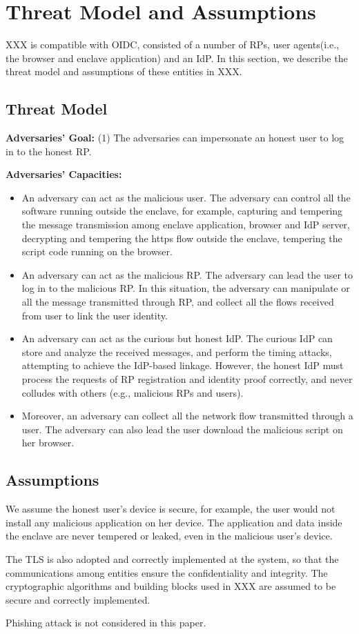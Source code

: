 \section{Threat Model and Assumptions}
XXX is compatible with OIDC, consisted of a number of RPs, user agents(i.e., the browser and enclave application) and an IdP. In this section, we describe the threat model and assumptions of these entities in XXX.
\subsection{Threat Model}
\noindent\textbf{Adversaries' Goal: } (1) The adversaries can impersonate an honest user to log in to the honest RP.

\noindent\textbf{Adversaries' Capacities: }
\begin{itemize}
\item An adversary can act as the malicious user. The adversary can control all the software running outside the enclave, for example, capturing and tempering the message transmission among enclave application, browser and IdP server, decrypting and tempering the https flow outside the enclave, tempering the script code running on the browser.
\item An adversary can act as the malicious RP. The adversary can lead the user to log in to the malicious RP. In this situation, the adversary can manipulate or all the message transmitted through RP, and collect all the flows received from user to link the user identity.
\item An adversary can act as the curious but honest IdP. The curious IdP can store and analyze the received messages, and perform the timing attacks, attempting to achieve the IdP-based linkage. However, the honest IdP must process the requests of RP registration and identity proof correctly, and never colludes with others (e.g., malicious RPs and users).
\item Moreover, an adversary can collect all the network flow transmitted through a user. The adversary can also lead the user download the malicious script on her browser.
\end{itemize}

\subsection{Assumptions}
We assume the honest user's device is secure, for example, the user would not install any malicious application on her device. The application and data inside the enclave are never tempered or leaked, even in the malicious user's device.

The TLS is also adopted and correctly implemented at the system, so that the communications among entities ensure the confidentiality and integrity.
The cryptographic algorithms and building blocks used in XXX are assumed to be secure and correctly implemented. 

Phishing attack is not considered in this paper.

